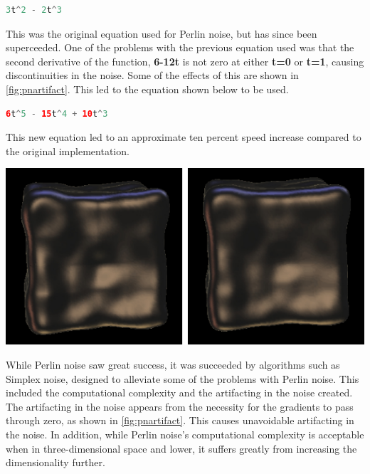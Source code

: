 \documentclass[10pt]{report}
\begin{document}
				\begin{lstlisting}[language=C]
					3t^2 - 2t^3
				\end{lstlisting}
				
				This was the original equation used for Perlin noise, but has since been superceeded. One of the problems with the previous equation used was that the second derivative of the function, \textbf{6-12t} is not zero at either \textbf{t=0} or \textbf{t=1}, causing discontinuities in the noise. Some of the effects of this are shown in \autoref{fig:pnartifact}. This led to the equation shown below to be used. 
				
				\begin{lstlisting}[language=Java]
					6t^5 - 15t^4 + 10t^3
				\end{lstlisting}
				
				This new equation led to an approximate ten percent speed increase compared to the original implementation. 
				
				\begin{minipage}{\textwidth}
					\centering
					\includegraphics[scale=.5]{s-curve}
					\label{fig:pnartifact}
				\end{minipage} 
				
				While Perlin noise saw great success, it was succeeded by algorithms such as Simplex noise, designed to alleviate some of the problems with Perlin noise. This included the computational complexity and the artifacting in the noise created. The artifacting in the noise appears from the necessity for the gradients to pass through zero, as shown in \autoref{fig:pnartifact}. This causes unavoidable artifacting in the noise. In addition, while Perlin noise's computational complexity is acceptable when in three-dimensional space and lower, it suffers greatly from increasing the dimensionality further.
		
\end{document}
